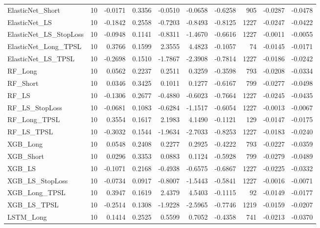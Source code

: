 \begin{tabular}{llrrrrrrrr}
\cline{1-10}
ElasticNet\_Short & 10 & -0.0171 & 0.3356 & -0.0510 & -0.0658 & -0.6258 & 905 & -0.0287 & -0.0478 \\
\cline{1-10}
ElasticNet\_LS & 10 & -0.1842 & 0.2558 & -0.7203 & -0.8493 & -0.8125 & 1227 & -0.0247 & -0.0422 \\
\cline{1-10}
ElasticNet\_LS\_StopLoss & 10 & -0.0948 & 0.1141 & -0.8311 & -1.4670 & -0.6616 & 1227 & -0.0011 & -0.0055 \\
\cline{1-10}
ElasticNet\_Long\_TPSL & 10 & 0.3766 & 0.1599 & 2.3555 & 4.4823 & -0.1057 & 74 & -0.0145 & -0.0171 \\
\cline{1-10}
ElasticNet\_LS\_TPSL & 10 & -0.2698 & 0.1510 & -1.7867 & -2.3908 & -0.7814 & 1227 & -0.0186 & -0.0242 \\
\cline{1-10}
RF\_Long & 10 & 0.0562 & 0.2237 & 0.2511 & 0.3259 & -0.3598 & 793 & -0.0208 & -0.0334 \\
\cline{1-10}
RF\_Short & 10 & 0.0346 & 0.3425 & 0.1011 & 0.1277 & -0.6167 & 799 & -0.0277 & -0.0498 \\
\cline{1-10}
RF\_LS & 10 & -0.1306 & 0.2677 & -0.4880 & -0.6023 & -0.7664 & 1227 & -0.0245 & -0.0435 \\
\cline{1-10}
RF\_LS\_StopLoss & 10 & -0.0681 & 0.1083 & -0.6284 & -1.1517 & -0.6054 & 1227 & -0.0013 & -0.0067 \\
\cline{1-10}
RF\_Long\_TPSL & 10 & 0.3554 & 0.1617 & 2.1983 & 4.1490 & -0.1121 & 129 & -0.0147 & -0.0175 \\
\cline{1-10}
RF\_LS\_TPSL & 10 & -0.3032 & 0.1544 & -1.9634 & -2.7033 & -0.8253 & 1227 & -0.0183 & -0.0240 \\
\cline{1-10}
XGB\_Long & 10 & 0.0548 & 0.2408 & 0.2277 & 0.2925 & -0.4222 & 793 & -0.0227 & -0.0359 \\
\cline{1-10}
XGB\_Short & 10 & 0.0296 & 0.3353 & 0.0883 & 0.1124 & -0.5928 & 799 & -0.0279 & -0.0489 \\
\cline{1-10}
XGB\_LS & 10 & -0.1071 & 0.2168 & -0.4938 & -0.6575 & -0.6867 & 1227 & -0.0225 & -0.0332 \\
\cline{1-10}
XGB\_LS\_StopLoss & 10 & -0.0734 & 0.0917 & -0.8007 & -1.5443 & -0.5841 & 1227 & -0.0016 & -0.0071 \\
\cline{1-10}
XGB\_Long\_TPSL & 10 & 0.3947 & 0.1619 & 2.4379 & 4.5403 & -0.1115 & 92 & -0.0149 & -0.0177 \\
\cline{1-10}
XGB\_LS\_TPSL & 10 & -0.2514 & 0.1308 & -1.9228 & -2.5965 & -0.7746 & 1219 & -0.0159 & -0.0207 \\
\cline{1-10}
LSTM\_Long & 10 & 0.1414 & 0.2525 & 0.5599 & 0.7052 & -0.4358 & 741 & -0.0213 & -0.0370 \\

\end{tabular}
